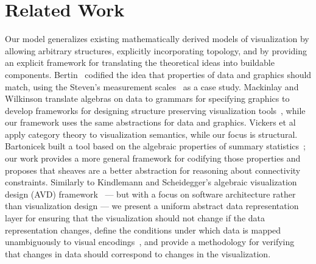 \documentclass{vgtc}
\begin{document}
\section{Related Work}
\label{sec:related-work}
Our model generalizes existing mathematically derived models of visualization by allowing arbitrary structures, explicitly incorporating topology, and by providing an explicit framework for translating the theoretical ideas into buildable components. Bertin~\cite{bertinSemiologyGraphicsDiagrams2011} codified the idea that properties of data and graphics should match, using the Steven's measurement scales~\cite{stevensTheoryScalesMeasurement1946} as a case study. Mackinlay and Wilkinson translate algebras on data to grammars for specifying graphics to develop frameworks for designing structure preserving visualization tools~\cite{mackinlayAutomatingDesignGraphical1986,mackinlayAutomaticDesignGraphical1987, wilkinsonGrammarGraphics2005}, while our framework uses the same abstractions for data and graphics. Vickers et al~\cite{vickersUnderstandingVisualizationFormal2013} apply category theory to visualization semantics, while our focus is structural. Bartonicek built a tool based on the algebraic properties of summary statistics~\cite{bartonicekNoMoreNo2025}; our work provides a more general framework for codifying those properties and proposes that sheaves are a better abstraction for reasoning about connectivity constraints. Similarly to Kindlemann and Scheidegger's algebraic visualization design (AVD) framework~\cite{kindlmannAlgebraicProcessVisualization2014} --- but with a focus on software architecture rather than visualization design --- we present a uniform abstract data representation layer for ensuring that the visualization should not change if the data representation changes, define the conditions under which data is mapped unambiguously to visual encodings~\cite{ziemkiewiczEmbeddingInformationVisualization2009}, and provide a methodology for verifying that changes in data should correspond to changes in the visualization. 
\end{document}
